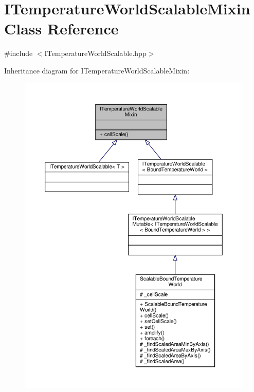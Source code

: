 \hypertarget{class_i_temperature_world_scalable_mixin}{\section{I\-Temperature\-World\-Scalable\-Mixin Class Reference}
\label{class_i_temperature_world_scalable_mixin}
}


{\ttfamily \#include $<$I\-Temperature\-World\-Scalable.\-hpp$>$}



Inheritance diagram for I\-Temperature\-World\-Scalable\-Mixin\-:
\nopagebreak
\begin{figure}[H]
\begin{center}
\leavevmode
\includegraphics[width=350pt]{class_i_temperature_world_scalable_mixin__inherit__graph}
\end{center}
\end{figure}


